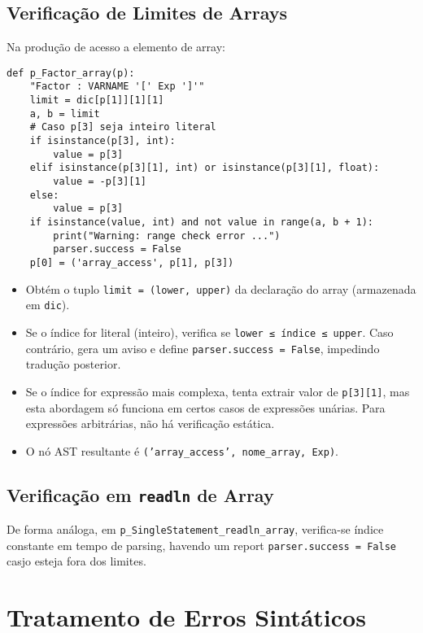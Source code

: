\subsection{Verificação de Limites de Arrays}

Na produção de acesso a elemento de array:

\begin{verbatim}
def p_Factor_array(p):
    "Factor : VARNAME '[' Exp ']'"
    limit = dic[p[1]][1][1]
    a, b = limit
    # Caso p[3] seja inteiro literal
    if isinstance(p[3], int):
        value = p[3]
    elif isinstance(p[3][1], int) or isinstance(p[3][1], float):
        value = -p[3][1]
    else:
        value = p[3]
    if isinstance(value, int) and not value in range(a, b + 1):
        print("Warning: range check error ...")
        parser.success = False
    p[0] = ('array_access', p[1], p[3])
\end{verbatim}

\noindent

\begin{itemize}
    \item Obtém o tuplo \texttt{limit = (lower, upper)} da declaração do array (armazenada em \texttt{dic}).
    \item Se o índice for literal (inteiro), verifica se \texttt{lower ≤ índice ≤ upper}. Caso contrário, gera um aviso e define \texttt{parser.success = False}, impedindo tradução posterior.
    \item Se o índice for expressão mais complexa, tenta extrair valor de \texttt{p[3][1]}, mas esta abordagem só funciona em certos casos de expressões unárias. Para expressões arbitrárias, não há verificação estática.
    \item O nó AST resultante é \texttt{('array\_access', nome\_array, Exp)}.
\end{itemize}

\subsection{Verificação em \texttt{readln} de Array}

De forma análoga, em \texttt{p\_SingleStatement\_readln\_array}, verifica-se índice constante em tempo de parsing, havendo um report \texttt{parser.success = False} casjo esteja fora dos limites.

\section{Tratamento de Erros Sintáticos}
\label{sec:erros}


